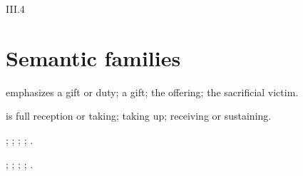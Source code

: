 \begin{courseunit}{III.4}
\section{Semantic families}

\begin{description}[style=nextline]
  \item[Gift:]  emphasizes a gift or duty;  a gift;
     the offering;  the sacrificial victim.
  \item[Reception:]  is full reception or taking;
     taking up;  receiving or sustaining.
  \item[Effect:] ; ;
    ; ; .
  \item[Sign:] ; ; ;
    ; .
\end{description}




\end{courseunit}

